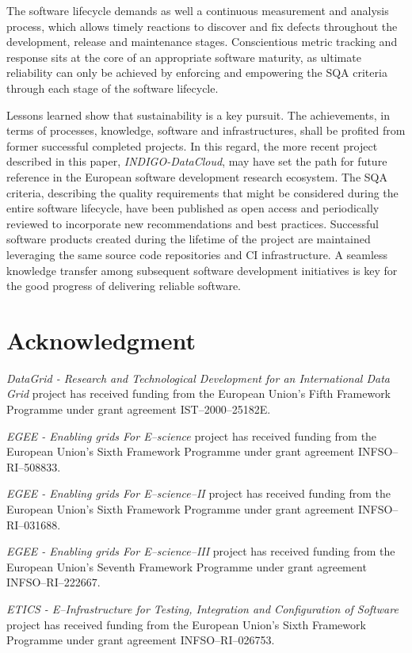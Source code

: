 \documentclass[journal]{IEEEtran}
\begin{document}
The software lifecycle demands as well a continuous measurement and analysis
process, which allows timely reactions to discover and fix defects throughout the
development, release and maintenance stages. Conscientious metric
tracking and response sits at the core of an appropriate software maturity, as
ultimate reliability can only be achieved by enforcing and empowering the SQA
criteria through each stage of the software lifecycle.

Lessons learned show that sustainability is a key pursuit. The achievements, in terms of
processes, knowledge, software and infrastructures, shall be profited from former successful
completed projects. In this regard, the more recent project described in this paper, {\sl INDIGO-DataCloud},
may have set the path for future reference in the European software development research ecosystem.
The SQA criteria, describing the quality requirements that might be considered during the entire
software lifecycle, have been published as open access and periodically reviewed to incorporate
new recommendations and best practices. Successful software products created during the lifetime of the
project are maintained leveraging the same source code repositories and CI infrastructure. A seamless
knowledge transfer among subsequent software development initiatives is key for the good progress of
delivering reliable software.


\section*{Acknowledgment}

{\sl DataGrid - Research and Technological Development for an International Data Grid}
project has received funding from the European Union's Fifth Framework Programme under
grant agreement IST--2000--25182E.

{\sl EGEE - Enabling grids For E--science} project has received funding from the European
Union's Sixth Framework Programme under grant agreement INFSO--RI--508833.

{\sl EGEE - Enabling grids For E--science--II} project has received funding from the
European Union's Sixth Framework Programme under grant agreement INFSO--RI--031688.

{\sl EGEE - Enabling grids For E--science--III} project has received funding from the
European Union's Seventh Framework Programme under grant agreement INFSO--RI--222667.

{\sl ETICS - E--Infrastructure for Testing, Integration and Configuration of Software}
project has received funding from the European Union's Sixth Framework Programme under
grant agreement INFSO--RI--026753.
\end{document}
